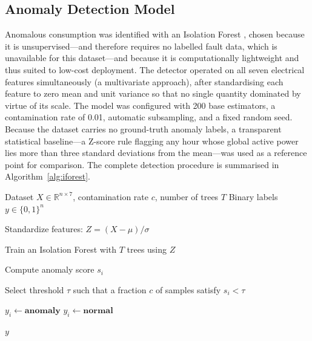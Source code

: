 \documentclass[conference]{IEEEtran}
\begin{document}
\subsection{Anomaly Detection Model}
Anomalous consumption was identified with an Isolation Forest
\cite{liu2008isolation}, chosen because it is unsupervised---and therefore
requires no labelled fault data, which is unavailable for this dataset---and
because it is computationally lightweight and thus suited to low-cost
deployment. The detector operated on all seven electrical features
simultaneously (a multivariate approach), after standardising each feature to
zero mean and unit variance so that no single quantity dominated by virtue of
its scale. The model was configured with 200 base estimators, a contamination
rate of 0.01, automatic subsampling, and a fixed random seed. Because the
dataset carries no ground-truth anomaly labels, a transparent statistical
baseline---a Z-score rule flagging any hour whose global active power lies more
than three standard deviations from the mean---was used as a reference point for comparison. The complete detection procedure is summarised in Algorithm~\ref{alg:iforest}. 
\begin{algorithm}[t]
\caption{Multivariate Anomaly Detection using Isolation Forest}
\label{alg:iforest}
\small
\begin{algorithmic}[1]

\Require Dataset $X\in\mathbb{R}^{n\times7}$, contamination rate $c$, number of trees $T$
\Ensure Binary labels $y\in\{0,1\}^{n}$

\State Standardize features:
      $Z=(X-\mu)/\sigma$

\State Train an Isolation Forest with $T$ trees using $Z$

    \State Compute anomaly score $s_i$
\EndFor

\State Select threshold $\tau$ such that a fraction $c$ of samples satisfy $s_i<\tau$

        \State $y_i \gets \textbf{anomaly}$
    \Else
        \State $y_i \gets \textbf{normal}$
    \EndIf
\EndFor

\Return $y$

\end{algorithmic}
\end{algorithm} 
 
\end{document}
